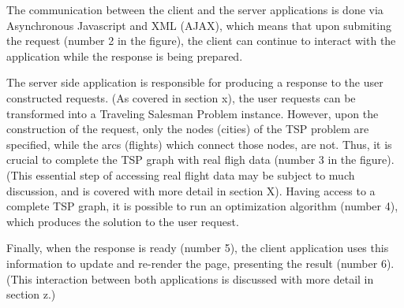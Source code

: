 The communication between the client and the server applications  
is done via Asynchronous Javascript and XML (AJAX),
which means that upon submiting the request (number 2 in the figure),
the client can continue to interact with the application 
while the response is being prepared.

The server side application is responsible for producing a 
response to the user constructed requests.
(As covered in section x), the user requests can be transformed into a Traveling Salesman Problem instance.
However, upon the construction of the request, only the nodes (cities) of the TSP problem are specified,
while the arcs (flights) which connect those nodes, are not.
Thus, it is crucial to complete the TSP graph with real fligh data (number 3 in the figure).
(This essential step of accessing real flight data may be subject to much discussion,
and is covered with more detail in section X).
Having access to a complete TSP graph, it is possible to run an optimization algorithm (number 4),
which produces the solution to the user request.

Finally, when the response is ready (number 5),
the client application uses this information to update and re-render the page, presenting the result (number 6).
(This interaction between both applications is discussed with more detail in section z.)
